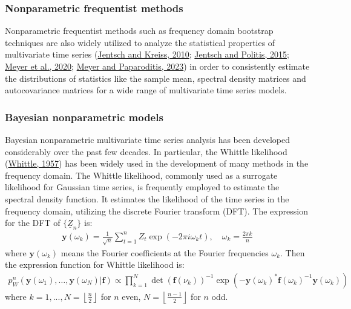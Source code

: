 \documentclass[12pt,a4paper]{article}
\begin{document}
\subsubsection{Nonparametric frequentist methods}
Nonparametric frequentist methods such as frequency domain bootstrap techniques are also widely utilized to analyze the statistical properties of multivariate time series (\hyperref[Jentsch2010]{Jentsch and Kreiss, 2010}; \hyperref[Jentsch2015]{Jentsch and Politis, 2015}; \hyperref[Meyer2020]{Meyer et al., 2020}; \hyperref[meyer2023]{Meyer and Paparoditis, 2023}) in order to consistently estimate the distributions of statistics like the sample mean, spectral density matrices and autocovariance matrices for a wide range of multivariate time series models.

\subsubsection{Bayesian nonparametric models}
Bayesian nonparametric multivariate time series analysis has been developed considerably over the past few decades.  In particular, the Whittle likelihood (\hyperref[whittle]{Whittle, 1957}) has been widely used in the development of many methods in the frequency domain. The Whittle likelihood, commonly used as a surrogate likelihood for Gaussian time series, is frequently employed to estimate the spectral density function. It estimates the likelihood of the time series in the frequency domain, utilizing the discrete Fourier transform (DFT). The expression for the DFT of $\{\underline{Z}_{n}\}$ is:
\begin{align*}
\mathbf{y}(\omega_k) = \frac{1}{\sqrt{n}} \sum_{t=1}^{n} Z_t\exp(-2\pi i\omega_k t), \quad \omega_k = \frac{2\pi k}{n}
\end{align*}
where $\mathbf{y}(\omega_k)$ means the Fourier coefficients at the Fourier frequencies $\omega_k$.
Then the expression function for Whittle likelihood is:
\begin{align*}
p^{n}_W(\mathbf{y}(\omega_1), \ldots, \mathbf{y}(\omega_N)| \bm{f}) 
\propto \prod_{k=1}^{N} \det(\bm{f}(\nu_k))^{-1} \exp\left(-\mathbf{y}(\omega_k)^* \bm{f}(\omega_k)^{-1} \mathbf{y}(\omega_k)\right)
\end{align*}
where $k = 1, ..., N = \left\lfloor \frac{n}{2} \right\rfloor$ for $n$ even, $N = \left\lfloor \frac{n-1}{2} \right\rfloor$ for $n$ odd.
\end{document}
